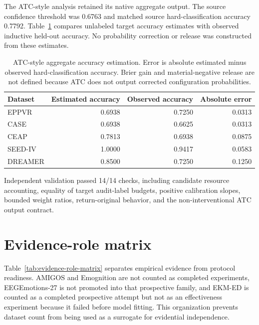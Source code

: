 \documentclass[preprint,12pt]{elsarticle}
\begin{document}
The ATC-style analysis retained its native aggregate output. The source confidence threshold was 0.6763 and matched source hard-classification accuracy 0.7792. Table~\ref{tab:atc-style} compares unlabeled target accuracy estimates with observed inductive held-out accuracy. No probability correction or release was constructed from these estimates.

\begin{table}[!htbp]
\centering
\caption{ATC-style aggregate accuracy estimation. Error is absolute estimated minus observed hard-classification accuracy. Brier gain and material-negative release are not defined because ATC does not output corrected configuration probabilities.}
\label{tab:atc-style}
\small
\begin{tabular}{lrrr}
\toprule
Dataset & Estimated accuracy & Observed accuracy & Absolute error \\
\midrule
EPPVR & 0.6938 & 0.7250 & 0.0313 \\
CASE & 0.6938 & 0.6625 & 0.0313 \\
CEAP & 0.7813 & 0.6938 & 0.0875 \\
SEED-IV & 1.0000 & 0.9417 & 0.0583 \\
DREAMER & 0.8500 & 0.7250 & 0.1250 \\
\bottomrule
\end{tabular}
\end{table}

Independent validation passed 14/14 checks, including candidate resource accounting, equality of target audit-label budgets, positive calibration slopes, bounded weight ratios, return-original behavior, and the non-interventional ATC output contract.


\section{Evidence-role matrix}

Table~\ref{tab:evidence-role-matrix} separates empirical evidence from protocol readiness. AMIGOS and Emognition are not counted as completed experiments, EEGEmotions-27 is not promoted into that prospective family, and EKM-ED is counted as a completed prospective attempt but not as an effectiveness experiment because it failed before model fitting. This organization prevents dataset count from being used as a surrogate for evidential independence.

\begin{table}[!htbp]
\centering
\caption{Evidence roles and inferential boundaries. Original dataset licenses, approvals, and participant-consent conditions govern data release.}
\label{tab:evidence-role-matrix}
\small
\setlength{\tabcolsep}{3pt}
\renewcommand{\arraystretch}{1.08}

\end{table}
\end{document}

